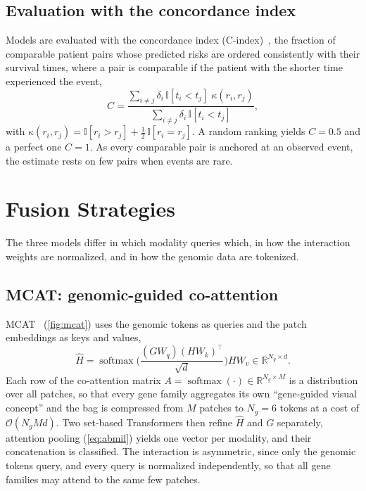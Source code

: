 \documentclass[10pt,twocolumn,letterpaper]{article}
\newcommand{\R}{\mathbb{R}}
\newcommand{\ind}{\mathbb{I}}
\DeclareMathOperator{\softmax}{softmax}
\begin{document}
\subsection{Evaluation with the concordance index}
\label{sec:cindex}

Models are evaluated with the concordance index (C-index)~\cite{hemker2024healnet,raza2025ps3}, the fraction of comparable patient pairs whose predicted risks are ordered consistently with their survival times, where a pair is comparable if the patient with the shorter time experienced the event,
\begin{equation}
  C=\frac{\sum_{i\neq j}\delta_i\,\ind[t_i<t_j]\;\kappa(r_i,r_j)}{\sum_{i\neq j}\delta_i\,\ind[t_i<t_j]}, \label{eq:cindex}
\end{equation}
with $\kappa(r_i,r_j)=\ind[r_i>r_j]+\tfrac12\,\ind[r_i=r_j]$. A random ranking yields $C=0.5$ and a perfect one $C=1$. As every comparable pair is anchored at an observed event, the estimate rests on few pairs when events are rare.

\section{Fusion Strategies}
\label{sec:fusion}

The three models differ in which modality queries which, in how the interaction weights are normalized, and in how the genomic data are tokenized.

\subsection{MCAT: genomic-guided co-attention}
\label{sec:mcat}

MCAT~\cite{chen2021mcat} (\cref{fig:mcat}) uses the genomic tokens as queries and the patch embeddings as keys and values,
\begin{equation}
  \hat H=\softmax\!\Big(\frac{(GW_q)(HW_k)^\top}{\sqrt{d}}\Big)HW_v\in\R^{N_g\times d}. \label{eq:gca}
\end{equation}
Each row of the co-attention matrix $A=\softmax(\cdot)\in\R^{N_g\times M}$ is a distribution over all patches, so that every gene family aggregates its own ``gene-guided visual concept'' and the bag is compressed from $M$ patches to $N_g=6$ tokens at a cost of $\mathcal{O}(N_gMd)$. Two set-based Transformers then refine $\hat H$ and $G$ separately, attention pooling (\cref{eq:abmil}) yields one vector per modality, and their concatenation is classified. The interaction is asymmetric, since only the genomic tokens query, and every query is normalized independently, so that all gene families may attend to the same few patches.
\end{document}
